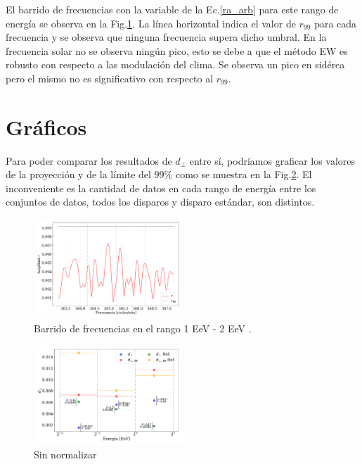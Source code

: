     El barrido de frecuencias con la variable de la Ec.\ref{ra_arb} para este rango de energía se observa en la Fig.\ref{fig:tercer_barrido}. La línea horizontal indica el valor de $r_{99}$ para cada frecuencia y se observa que ninguna frecuencia supera dicho umbral. En la frecuencia solar no se observa ningún pico, esto se debe a que el método EW es robusto con respecto a las modulación del clima. Se observa un pico en sidérea pero el mismo no es significativo con respecto al $r_{99}$.

    \section*{Gráficos}

    Para poder comparar los resultados de $d_\perp$ entre sí, podríamos graficar los valores de la proyección y de la límite del $99\%$ como se muestra en la Fig.\ref{fig:no_normalizado}. El inconveniente es la cantidad de datos en cada rango de energía entre los conjuntos de datos, todos los disparos y disparo estándar, son distintos.

    \begin{figure}[H]
        \begin{small}
            \begin{center}
                \includegraphics[width=0.5\textwidth]{plot_bin_3_barrido_v2.pdf}
            \end{center}
            \caption{Barrido de frecuencias en el rango 1 EeV - 2 EeV .}
            \label{fig:tercer_barrido}
        \end{small}
    \end{figure}    


    \begin{figure}[H]
        \begin{small}
            \begin{center}
                \includegraphics[width=0.5\textwidth]{d_perp_no_normalizado_v2.pdf}
            \end{center}
            \caption{Sin normalizar}
            \label{fig:no_normalizado}
        \end{small}
    \end{figure}
    
